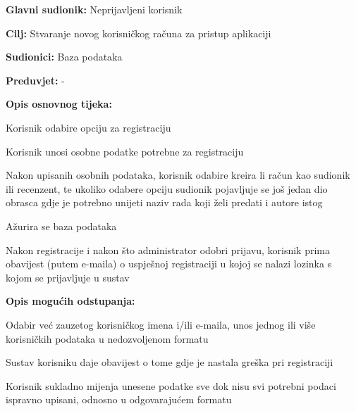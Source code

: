 					\noindent {}
					\begin{packed_item}
	
						\item \textbf{Glavni sudionik: } Neprijavljeni korisnik
						\item  \textbf{Cilj:} Stvaranje novog korisničkog računa za pristup aplikaciji
						\item  \textbf{Sudionici:} Baza podataka
						\item  \textbf{Preduvjet:} -
						\item  \textbf{Opis osnovnog tijeka:}
						
						\item[] \begin{packed_enum}
	
							\item Korisnik odabire opciju za registraciju
							\item Korisnik unosi osobne podatke potrebne za registraciju
							\item Nakon upisanih osobnih podataka, korisnik odabire kreira li račun kao sudionik ili recenzent, te ukoliko odabere opciju sudionik pojavljuje se još jedan dio obrasca gdje je potrebno unijeti naziv rada koji želi predati i autore istog
							\item Ažurira se baza podataka
							\item Nakon registracije i nakon što administrator odobri prijavu, korisnik prima obavijest (putem e-maila) o uspješnoj registraciji u kojoj se nalazi lozinka s kojom se prijavljuje u sustav
						\end{packed_enum}

						\item  \textbf{Opis mogućih odstupanja:}
						
						\item[] \begin{packed_item}
	
							\item[2.a]  Odabir već zauzetog korisničkog imena i/ili e-maila, unos jednog ili više korisničkih podataka u nedozvoljenom formatu
							\item[] \begin{packed_enum}
								
								\item Sustav korisniku daje obavijest o tome gdje je nastala greška pri registraciji
								\item Korisnik sukladno mijenja unesene podatke sve dok nisu svi potrebni podaci ispravno upisani, odnosno u odgovarajućem formatu
								
							\end{packed_enum}
							
						\end{packed_item}
			
					\end{packed_item}


